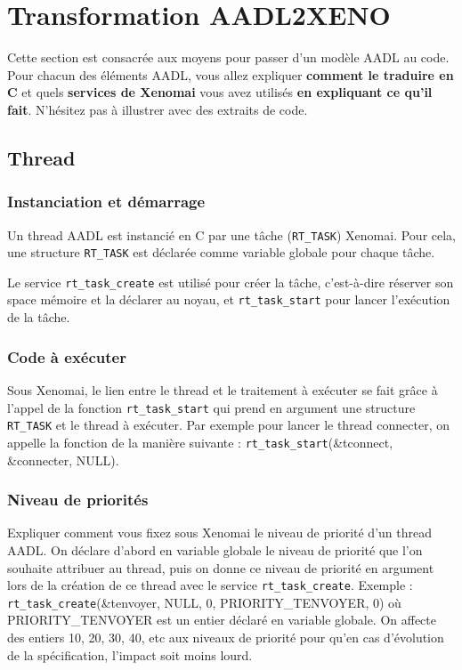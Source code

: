 \documentclass[11pt, a4paper]{paper}
\begin{document}
{\section{Transformation AADL2XENO}
 
 {\color{red} Cette section est consacrée aux moyens pour passer d'un modèle AADL au code. Pour chacun des éléments AADL, vous allez expliquer {\bf comment le traduire en C} et quels {\bf services de Xenomai} vous avez utilisés {\bf en expliquant ce qu'il fait}. N'hésitez pas à illustrer avec des extraits de code.}
 
\subsection{Thread}
\subsubsection{Instanciation et démarrage}
{\color{black} Un thread AADL est instancié en C par une tâche ({\tt RT\_TASK}) Xenomai.  Pour cela, une structure {\tt RT\_TASK} est déclarée comme variable globale pour chaque tâche.

Le service {\tt rt\_task\_create} est utilisé pour créer la tâche, c'est-à-dire réserver son space mémoire et la déclarer au noyau, et {\tt rt\_task\_start} pour lancer l'exécution de la tâche.}

\subsubsection{Code à exécuter}
 {\color{black} Sous Xenomai, le lien entre le thread et le traitement à exécuter se fait grâce à l'appel de la fonction {\tt rt\_task\_start} qui prend en argument une structure {\tt RT\_TASK} et le thread à exécuter. Par exemple pour lancer le thread connecter, on appelle la fonction de la manière suivante : {\tt rt\_task\_start}(\&tconnect, \&connecter, NULL).}

\subsubsection{Niveau de priorités}
 {\color{black} Expliquer comment vous fixez sous Xenomai le niveau de priorité d'un thread AADL. On déclare d'abord en variable globale le niveau de priorité que l'on souhaite attribuer au thread, puis on donne ce niveau de priorité en argument lors de la création de ce thread avec le service {\tt rt\_task\_create}}. Exemple : {\tt rt\_task\_create}(\&tenvoyer, NULL, 0, PRIORITY\_TENVOYER, 0) où PRIORITY\_TENVOYER est un entier déclaré en variable globale. On affecte des entiers 10, 20, 30, 40, etc aux niveaux de priorité pour qu'en cas d'évolution de la spécification, l'impact soit moins lourd.}
\end{document}
